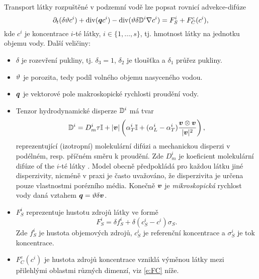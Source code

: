 



Transport látky rozpuštěné v podzemní vodě lze popsat rovnicí advekce-difúze
\begin{equation}
    \label{e:ADE}
   \partial_t ( \delta \th c^i) + \div ( \vc q c^i ) - \div (\th \delta \D^i \grad c^i ) = F_S^i + F^c_C(c^i), %
\end{equation}
kde $c^i$  je koncentrace $i$-té látky, $i\in\{1,\dots, s\}$, tj. hmotnost látky na jednotku objemu vody.
Další veličiny:
\begin{itemize}
\item $\delta$  je rozevření pukliny, tj. $\delta_3=1$, $\delta_2$ je tloušťka a $\delta_1$ průřez pukliny.
\item $\vartheta$ \units{}{}{} je porozita, tedy podíl volného objemu nasyceného vodou.
\item $\mathbf{\boldsymbol{q}}$ je vektorové pole makroskopické rychlosti proudění vody.
\item Tenzor hydrodynamické disperze ${{\mathbb{D}}}^i$  má tvar
\begin{equation} 
  \label{eqn:transport_disp}
  {{\mathbb{D}}}^i =D_m^i \tau {\mathbb{I}} + \lvert\mathbf{\boldsymbol{v}}\rvert\left(\alpha_T^i {\mathbb{I}} + (\alpha_L^i - \alpha_T^i) \frac{\mathbf{\boldsymbol{v}} \otimes \mathbf{\boldsymbol{v}}}{\lvert\mathbf{\boldsymbol{v}}\rvert^2}\right),
\end{equation}
reprezentující (izotropní) molekulární difúzi a mechanickou disperzi v podélném, resp. příčném směru k proudění.
Zde $D_m^i$  je koeficient molekulární difúze of the $i$-té látky%
.
Model obecně předpokládá pro každou látku jiné disperzivity, nicméně v praxi je často uvažováno, že disperzivita je určena pouze vlastnostmi porézního média.
Konečně $\mathbf{\boldsymbol{v}}$  je \emph{mikroskopická} rychlost vody daná vztahem $\mathbf{\boldsymbol{q}} = \vartheta\delta\mathbf{\boldsymbol{v}}$.

\item $F_S^i$  reprezentuje hustotu zdrojů látky ve formě
\begin{equation}
 F_S^i = \delta f^i_S + \delta(c_S^i-c^i)\sigma_S. \label{eqn:transport_sources}
\end{equation}
Zde $f_S^i$  je hustota objemových zdrojů, $c_S^i$  je referenční koncentrace a $\sigma_S^i$  je tok koncentrace.

\item $F^c_C(c^i)$  je hustota zdrojů koncentrace vzniklá výměnou látky mezi přilehlými oblastmi různých dimenzí, viz \eqref{e:FC} níže.

\end{itemize}




